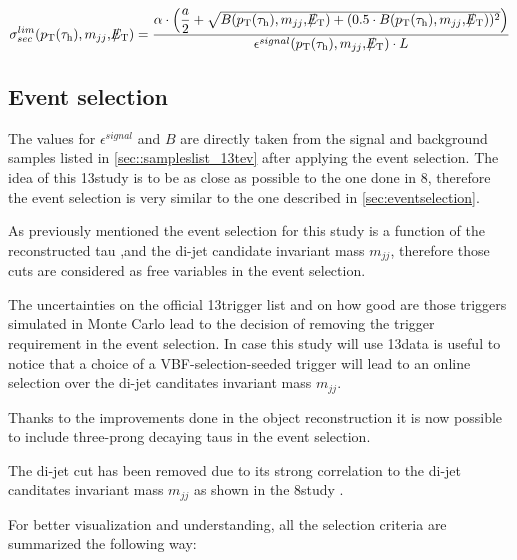 \begin{equation}
\sigma^{lim}_{sec}( \pt(\hadtau) , m_{jj} ,  \met ) = \dfrac{\alpha \cdot\left(\dfrac{a}{2} + \sqrt{B( \pt(\hadtau) , m_{jj} ,  \met ) + (0.5 \cdot B( \pt(\hadtau) , m_{jj} ,  \met ))^{2}}\right)}{\epsilon^{signal} ( \pt(\hadtau) , m_{jj} ,  \met ) \cdot L}
\label{eq::xsec_lim}
\end{equation}



\subsection{Event selection}
\label{subsec::event_sel_13tev}

The values for $\epsilon^{signal}$ and $B$ are directly taken from the signal and background samples listed in \autoref{sec::sampleslist_13tev} after applying the event selection. The idea of this 13\tev study is to be as close as possible to the one done in 8\tev, therefore the event selection is very similar to the one described in \autoref{sec:eventselection}.

As previously mentioned the event selection for this study is a function of the reconstructed tau \pt ,\met and the di-jet candidate invariant mass $m_{jj}$, therefore those cuts are considered as free variables in the event selection. 

The uncertainties on the official 13\tev trigger list and on how good are those triggers simulated in Monte Carlo lead to the decision of removing the trigger requirement in the event selection. In case this study will use 13\tev data is useful to notice that a choice of a VBF-selection-seeded trigger will lead to an online selection over the di-jet canditates invariant mass $m_{jj}$.

Thanks to the improvements done in the \hadtau object reconstruction it is now possible to include three-prong decaying taus in the event selection.

The di-jet \deltaeta cut has been removed due to its strong correlation to the di-jet canditates invariant mass $m_{jj}$ as shown in the 8\tev study \cite{Khachatryan:2015kxa}.

For better visualization and understanding, all the selection criteria are summarized the following way:

